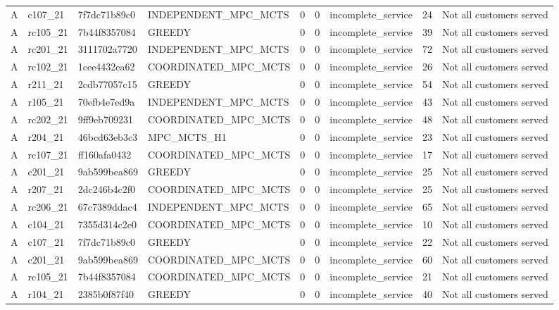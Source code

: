 \begin{table}
{\begin{tabular}{llllrrlrl}
A & c107\_21 & 7f7dc71b89c0 & INDEPENDENT\_MPC\_MCTS & 0 & 0 & incomplete\_service & 24 & Not all customers served \\
A & rc105\_21 & 7b44f8357084 & GREEDY & 0 & 0 & incomplete\_service & 39 & Not all customers served \\
A & rc201\_21 & 3111702a7720 & INDEPENDENT\_MPC\_MCTS & 0 & 0 & incomplete\_service & 72 & Not all customers served \\
A & rc102\_21 & 1cee4432ea62 & COORDINATED\_MPC\_MCTS & 0 & 0 & incomplete\_service & 26 & Not all customers served \\
A & r211\_21 & 2cdb77057c15 & GREEDY & 0 & 0 & incomplete\_service & 54 & Not all customers served \\
A & r105\_21 & 70efb4e7ed9a & INDEPENDENT\_MPC\_MCTS & 0 & 0 & incomplete\_service & 43 & Not all customers served \\
A & rc202\_21 & 9ff9eb709231 & COORDINATED\_MPC\_MCTS & 0 & 0 & incomplete\_service & 48 & Not all customers served \\
A & r204\_21 & 46bcd63eb3c3 & MPC\_MCTS\_H1 & 0 & 0 & incomplete\_service & 23 & Not all customers served \\
A & rc107\_21 & ff160afa0432 & COORDINATED\_MPC\_MCTS & 0 & 0 & incomplete\_service & 17 & Not all customers served \\
A & c201\_21 & 9ab599bea869 & GREEDY & 0 & 0 & incomplete\_service & 25 & Not all customers served \\
A & r207\_21 & 2dc246b4c2f0 & COORDINATED\_MPC\_MCTS & 0 & 0 & incomplete\_service & 25 & Not all customers served \\
A & rc206\_21 & 67c7389ddac4 & INDEPENDENT\_MPC\_MCTS & 0 & 0 & incomplete\_service & 65 & Not all customers served \\
A & c104\_21 & 7355d314c2e0 & COORDINATED\_MPC\_MCTS & 0 & 0 & incomplete\_service & 10 & Not all customers served \\
A & c107\_21 & 7f7dc71b89c0 & GREEDY & 0 & 0 & incomplete\_service & 22 & Not all customers served \\
A & c201\_21 & 9ab599bea869 & COORDINATED\_MPC\_MCTS & 0 & 0 & incomplete\_service & 60 & Not all customers served \\
A & rc105\_21 & 7b44f8357084 & COORDINATED\_MPC\_MCTS & 0 & 0 & incomplete\_service & 21 & Not all customers served \\
A & r104\_21 & 2385b0f87f40 & GREEDY & 0 & 0 & incomplete\_service & 40 & Not all customers served \\

\end{tabular}}
\end{table}
